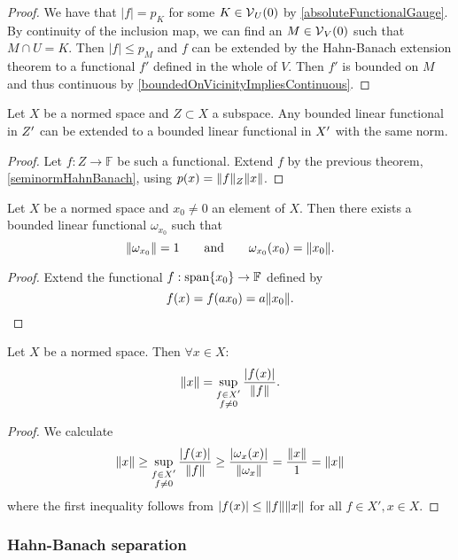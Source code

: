 \begin{proof}
We have that $|f| = p_K$ for some $K\in \operatorname{\mathcal{V}}_U(0)$ by \ref{absoluteFunctionalGauge}. 
By continuity of the inclusion map, we can find an $M \in \operatorname{\mathcal{V}}_V(0)$ such that $M\cap U = K$. Then $|f|\leq p_M$ and $f$ can be extended by the Hahn-Banach extension theorem to a functional $f'$ defined in the whole of $V$. Then $f'$ is bounded on $M$ and thus continuous by \ref{boundedOnVicinityImpliesContinuous}.
\end{proof}
\begin{corollary}
Let $X$ be a normed space and $Z\subset X$ a subspace. Any bounded linear functional in ${Z}^\prime$ can be extended to a bounded linear functional in ${X}^\prime$ with the same norm.
\end{corollary}
\begin{proof}
Let $f:Z\to \mathbb{F}$ be such a functional. Extend $f$ by the previous theorem, \ref{seminormHahnBanach}, using $p(x) = \lVert f\rVert_Z\lVert x\rVert$.
\end{proof}
\begin{corollary} \label{existenceBoundedFunctionalOfSameNorm}
Let $X$ be a normed space and $x_0\neq 0$ an element of $X$. Then there exists a bounded linear functional $\omega_{x_0}$ such that
\[ \lVert\omega_{x_0}\rVert = 1 \qquad \text{and} \qquad \omega_{x_0}(x_0)=\lVert x_0\rVert. \]
\end{corollary}
\begin{proof}
Extend the functional $f: \operatorname{span}\{x_0\}\to \mathbb{F}$ defined by
\[ f(x) = f(ax_0) = a\lVert x_0\rVert. \]
\end{proof}
\begin{corollary}
Let $X$ be a normed space. Then $\forall x\in X:$
\[ \lVert x\rVert = \sup_{\substack{f\in X' \\ f\neq 0}}\frac{|f(x)|}{\lVert f\rVert}. \]
\end{corollary}
\begin{proof}
We calculate
\[ \lVert x\rVert \geq \sup_{\substack{f\in X' \\ f\neq 0}}\frac{|f(x)|}{\lVert f\rVert} \geq \frac{|\omega_{x}(x)|}{\lVert\omega_{x}\rVert} = \frac{\lVert x\rVert}{1} = \lVert x\rVert \]
where the first inequality follows from $|f(x)|\leq \lVert f\rVert\lVert x\rVert$ for all $f\in X', x\in X$.
\end{proof}

\subsubsection{Hahn-Banach separation}

